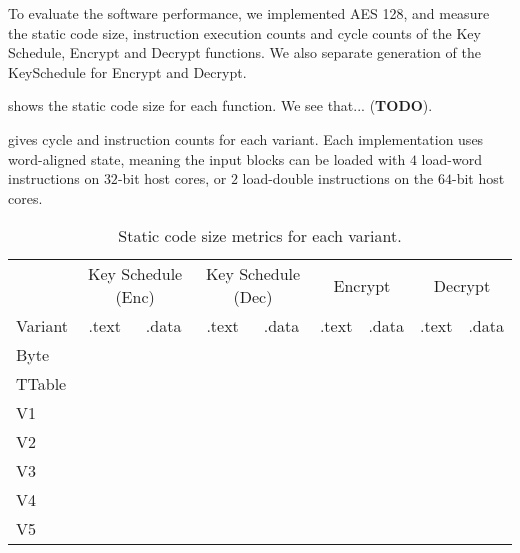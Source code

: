 To evaluate the software performance, we implemented AES 128, and
measure the static code size, instruction execution counts and cycle
counts of the Key Schedule, Encrypt and Decrypt functions.
We also separate generation of the KeySchedule for Encrypt and Decrypt.

 shows the static code size for each
function.
We see that... ({\bf TODO}).

 gives cycle and instruction counts for each
variant.
Each implementation uses word-aligned state, meaning the input blocks
can be loaded with $4$ load-word instructions on $32$-bit host cores,
or $2$ load-double instructions on the $64$-bit host cores.

\begin{table}
\centering
\begin{tabular}{l|cc|cc|cc|cc}
 &
\multicolumn{2}{c}{Key Schedule (Enc)} &
\multicolumn{2}{c}{Key Schedule (Dec)} &
\multicolumn{2}{c}{Encrypt} &
\multicolumn{2}{c}{Decrypt}  \\
Variant & .text & .data & .text & .data & .text & .data & .text & .data  \\ \hline
Byte    &       &       &       &       &       &       &       &        \\
TTable  &       &       &       &       &       &       &       &        \\
V1      &       &       &       &       &       &       &       &        \\
V2      &       &       &       &       &       &       &       &        \\
V3      &       &       &       &       &       &       &       &        \\
V4      &       &       &       &       &       &       &       &        \\
V5      &       &       &       &       &       &       &       &        \\
\end{tabular}
\caption{
Static code size metrics for each variant.
}
\label{tab:eval:sw:size}
\end{table}


